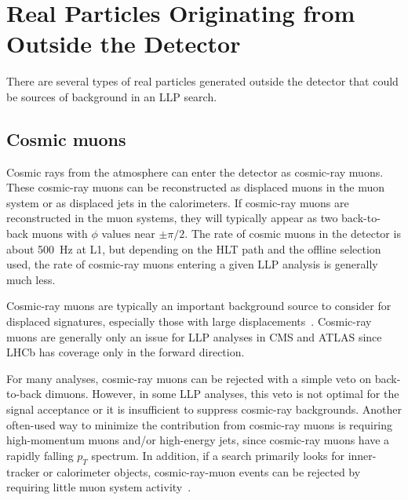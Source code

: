 
\section{Real Particles Originating from Outside the Detector} %

There are several types of real particles generated outside the detector that could be sources of background in an LLP search.

\subsection{Cosmic muons} %

Cosmic rays from the atmosphere can enter the detector as cosmic-ray muons. These cosmic-ray muons can be reconstructed as displaced muons in the muon system or as displaced jets in the calorimeters. If cosmic-ray muons are reconstructed in the muon systems, they will typically appear as two back-to-back muons with $\phi$ values near $\pm\pi/2$. The rate of cosmic muons in the detector is about 500~Hz at L1, but depending on the HLT path and the offline selection used, the rate of cosmic-ray muons entering a given LLP analysis is generally much less.

Cosmic-ray muons are typically an important background source to consider for displaced signatures, especially those with large displacements~\cite{Khachatryan:2015jha, Chatrchyan:2012dxa, Khachatryan:2010uf, Aad:2012zn,Aad:2013gva}. Cosmic-ray muons are generally only an issue for LLP analyses in CMS and ATLAS since LHCb has coverage only in the forward direction.

For many analyses, cosmic-ray muons can be rejected with a simple veto on back-to-back dimuons. However, in some LLP analyses, this veto is not optimal for the signal acceptance or it is insufficient to suppress cosmic-ray backgrounds. Another often-used way to minimize the contribution from cosmic-ray muons is requiring high-momentum muons and/or high-energy jets, since cosmic-ray muons have a rapidly falling $p_{T}$ spectrum. In addition, if a search primarily looks for inner-tracker or calorimeter objects, cosmic-ray-muon events can be rejected by requiring little muon system activity~\cite{Khachatryan:2015jha, Chatrchyan:2012dxa, Khachatryan:2010uf}.

